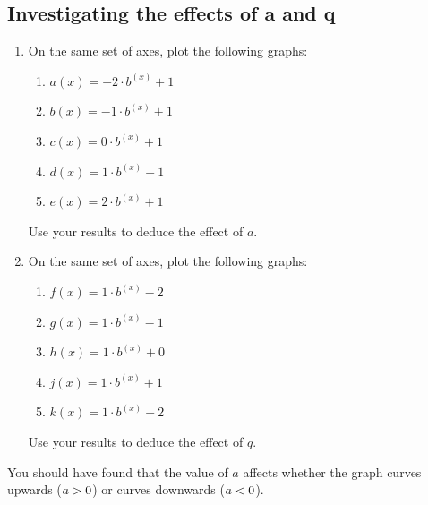             \subsection{  Investigating the effects of a and q}
            \nopagebreak
        \label{m39348*id249746}\begin{enumerate}[noitemsep, label=\textbf{\arabic*}. ] 
            \label{m39348*uid174}\item On the same set of axes, plot the following graphs:
\label{m39348*id249761}\begin{enumerate}[noitemsep, label=\textbf{\alph*}. ] 
            \label{m39348*uid175}\item $a\left(x\right)=-2\ensuremath{\cdot}{b}^{\left(x\right)}+1$\label{m39348*uid176}\item $b\left(x\right)=-1\ensuremath{\cdot}{b}^{\left(x\right)}+1$\label{m39348*uid177}\item $c\left(x\right)=0\ensuremath{\cdot}{b}^{\left(x\right)}+1$\label{m39348*uid178}\item $d\left(x\right)=1\ensuremath{\cdot}{b}^{\left(x\right)}+1$\label{m39348*uid179}\item $e\left(x\right)=2\ensuremath{\cdot}{b}^{\left(x\right)}+1$\end{enumerate}
Use your results to deduce the effect of $a$.
\label{m39348*uid180}\item On the same set of axes, plot the following graphs:
\label{m39348*id250057}\begin{enumerate}[noitemsep, label=\textbf{\alph*}. ] 
            \label{m39348*uid181}\item $f\left(x\right)=1\ensuremath{\cdot}{b}^{\left(x\right)}-2$\label{m39348*uid182}\item $g\left(x\right)=1\ensuremath{\cdot}{b}^{\left(x\right)}-1$\label{m39348*uid183}\item $h\left(x\right)=1\ensuremath{\cdot}{b}^{\left(x\right)}+0$\label{m39348*uid184}\item $j\left(x\right)=1\ensuremath{\cdot}{b}^{\left(x\right)}+1$\label{m39348*uid185}\item $k\left(x\right)=1\ensuremath{\cdot}{b}^{\left(x\right)}+2$\end{enumerate}
Use your results to deduce the effect of $q$.
\end{enumerate}
        \label{m39348*id250340}You should have found that the value of $a$ affects whether the graph curves upwards ($a>{}0$) or curves downwards ($a<{}0$).\par 
